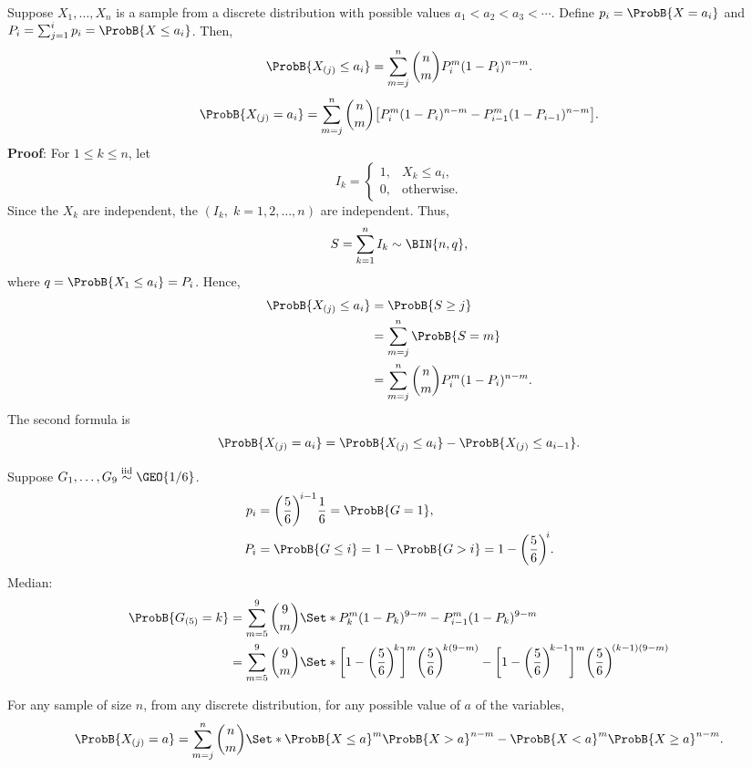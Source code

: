 \begin{Theorem}{}{}
    Suppose $ X_1,\ldots,X_n $ is a sample from a discrete
    distribution with possible values $ a_1<a_2<a_3<\cdots $.
    Define $ p_i=\ProbB{X=a_i} $ and
    $ P_i=\sum_{j=1}^{i}p_i=\ProbB{X\le a_i} $. Then,
    \[ \ProbB{X_{(j)}\le a_i}=
        \sum_{m=j}^{n}\binom{n}{m}P_i^m(1-P_i)^{n-m}. \]
    \[ \ProbB{X_{(j)}=a_i}=
        \sum_{m=j}^{n}\binom{n}{m}
        \bigl[P_i^m(1-P_i)^{n-m}-P_{i-1}^m(1-P_{i-1})^{n-m}\bigr]. \]
    \tcblower{}
    \textbf{Proof}: For $ 1\le k\le n $, let
    \[ I_k=\begin{cases}
            1, & X_k\le a_i,       \\
            0, & \text{otherwise}.
        \end{cases} \]
    Since the $ X_k $ are independent, the $ (I_k,\; k=1,2,\ldots,n) $
    are independent. Thus,
    \[ S=\sum_{k=1}^{n}I_k \sim \BIN{n,q}, \]
    where $ q=\ProbB{X_1\le a_i}=P_i $. Hence,
    \begin{align*}
        \ProbB{X_{(j)}\le a_i}
         & =\ProbB{S\ge j}                                \\
         & =\sum_{m=j}^{n}\ProbB{S=m}                     \\
         & =\sum_{m=j}^{n}\binom{n}{m}P_i^m(1-P_i)^{n-m}.
    \end{align*}
    The second formula is
    \[ \ProbB{X_{(j)}=a_i}=\ProbB{X_{(j)}\le a_i}-\ProbB{X_{(j)}\le a_{i-1}}. \]
\end{Theorem}
\begin{Example}{}{}
    Suppose $ G_1,\ldots,G_{9}\iid \GEO{1/6} $.
    \begin{align*}
        p_i & =\biggl(\frac{5}{6}\biggr)^{\!i-1}\frac{1}{6}=\ProbB{G=1},       \\
        P_i & =\ProbB{G\le i}=1-\ProbB{G>i}=1-\biggl(\frac{5}{6}\biggr)^{\!i}.
    \end{align*}
    Median:
    \begin{align*}
        \ProbB{G_{(5)}=k}
         & =\sum_{m=5}^{9}\binom{9}{m}\Set*{P_k^m(1-P_k)^{9-m}-P_{i-1}^m(1-P_k)^{9-m}} \\
         & =\sum_{m=5}^{9}\binom{9}{m}
        \Set*{\biggl[1-\biggl(\frac{5}{6}\biggr)^{\!k}\biggr]^{m}\biggl(\frac{5}{6}\biggr)^{\!k(9-m)}
            -\biggl[1-\biggl(\frac{5}{6}\biggr)^{\!k-1}\biggr]^{m}\biggl(\frac{5}{6}\biggr)^{\!(k-1)(9-m)}}
    \end{align*}
\end{Example}
\begin{Theorem}{}{}
    For any sample of size $ n $, from any discrete distribution,
    for any possible value of $ a $ of the variables,
    \[ \ProbB{X_{(j)}=a}=
        \sum_{m=j}^{n}\binom{n}{m}
        \Set*{\ProbB{X\le a}^m\ProbB{X>a}^{n-m}-
            \ProbB{X<a}^m\ProbB{X\ge a}^{n-m}}. \]
\end{Theorem}

